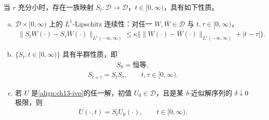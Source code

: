 \documentclass[../../main.tex]{subfiles}
\begin{document}
\begin{theorem}\label{theorem:ch14-标准半群}
当 $r$ 充分小时，存在一族映射 $S_t:\mathscr{D}\to\mathscr{D}$，$t\in[0,\infty)$，具有如下性质。
\begin{enumerate}[(a)]
\item $\mathscr{D}\times[0,\infty)$ 上的 $L^1$-Lipschitz 连续性：对任一 $W,\bar W\in\mathscr{D}$ 与 $t,\tau\in[0,\infty)$，
\begin{align}
\|S_tW(\cdot)-S_\tau\bar W(\cdot)\|_{L^1(-\infty,\infty)}\leqslant\kappa\{\|W(\cdot)-\bar W(\cdot)\|_{L^1(-\infty,\infty)}+|t-\tau|\}.
\label{align:ch14-semigroup-lip}
\end{align}
\item $\{S_t:t\in[0,\infty)\}$ 具有半群性质，即
\begin{align}
S_0=\text{恒等},
\label{align:ch14-S0}
\end{align}
\begin{align}
S_{t+\tau}=S_tS_\tau,\qquad t,\tau\in[0,\infty).
\label{align:ch14-semigroup}
\end{align}
\item 若 $U$ 是\eqref{align:ch13-ivp}的任一解，初值 $U_0\in\mathscr{D}$，且是某 $\delta$-近似解序列的 $\delta\downarrow0$ 极限，则
\begin{align}
U(\cdot,t)=S_tU_0(\cdot),\qquad t\in[0,\infty).
\label{align:ch14-trajectory}
\end{align}
\end{enumerate}
\end{theorem}
\end{document}
